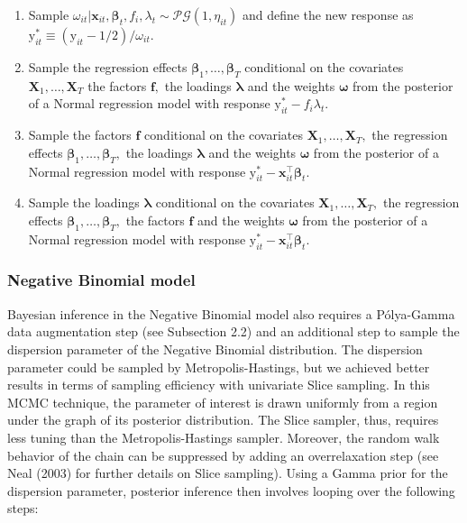 \documentclass[a4paper, preprint, 3p,
authoryear]{elsarticle} %
\begin{document}
\begin{enumerate}
    \item Sample $\omega_{it}|\textbf{x}_{it},\boldsymbol{\beta}_t,f_i,\lambda_t \sim \mathcal{PG}(1, \eta_{it})$ and define the new response as $\text{y}_{it}^* \equiv (\text{y}_{it}-1/2)/\omega_{it}$.
    \item Sample the regression effects $\boldsymbol{\beta}_1,\dots,\boldsymbol{\beta}_T$ conditional on the covariates $\textbf{X}_1,\dots,\textbf{X}_T$ the factors $\mathbf{f},$ the loadings $\boldsymbol{\lambda}$ and the weights $\boldsymbol{\omega}$ from the posterior of a Normal regression model with response $\text{y}_{it}^*-f_i\lambda_t.$
    \item Sample the factors $\mathbf{f}$ conditional on the covariates $\textbf{X}_1,\dots,\textbf{X}_T,$ the regression effects $\boldsymbol{\beta}_1,\dots,\boldsymbol{\beta}_T,$ the loadings $\boldsymbol{\lambda}$ and the weights $\boldsymbol{\omega}$ from the posterior of a Normal regression model with response  $\text{y}_{it}^*-\textbf{x}_{it}^\top \boldsymbol{\beta}_t$.
    \item Sample the loadings $\boldsymbol{\lambda}$ conditional on the covariates $\textbf{X}_1,\dots,\textbf{X}_T,$ the regression effects $\boldsymbol{\beta}_1,\dots,\boldsymbol{\beta}_T,$ the factors $\mathbf{f}$ and the weights $\boldsymbol{\omega}$ from the posterior of a Normal regression model with response  $\text{y}_{it}^*-\textbf{x}_{it}^\top \boldsymbol{\beta}_t.$
\end{enumerate}

\subsubsection{Negative Binomial model}\label{negative-binomial-model}

Bayesian inference in the Negative Binomial model also requires a
Pólya-Gamma data augmentation step (see Subsection 2.2) and an
additional step to sample the dispersion parameter of the Negative
Binomial distribution. The dispersion parameter could be sampled by
Metropolis-Hastings, but we achieved better results in terms of sampling
efficiency with univariate Slice sampling. In this MCMC technique, the
parameter of interest is drawn uniformly from a region under the graph
of its posterior distribution. The Slice sampler, thus, requires less
tuning than the Metropolis-Hastings sampler. Moreover, the random walk
behavior of the chain can be suppressed by adding an overrelaxation step
(see Neal (2003) for further details on Slice sampling). Using a Gamma
prior for the dispersion parameter, posterior inference then involves
looping over the following steps:
\end{document}
